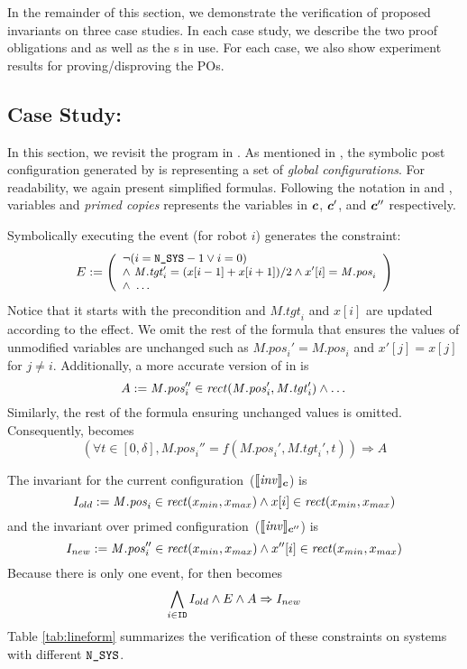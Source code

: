 In the remainder of this section,
we demonstrate the verification of proposed invariants on three case studies.
In each case study, we describe the two proof obligations  and 
as well as the \portasum{}s in use.
For each case, we also show experiment results for proving/disproving the POs.


\subsection{Case Study: \LineForm}

\newcommand{\Mposi}{\mathit{M.pos}_i}
\newcommand{\Mtgti}{\mathit{M.tgt}_i}

In this section, we revisit the \LineForm program in .
As mentioned in , the symbolic post configuration generated by \K is representing a set of \emph{global configurations}.
For readability, we again present simplified formulas.
Following the notation in  and ,
variables and \emph{primed copies} represents the variables in $\mathit{\boldsymbol{c}}$, $\mathit{\boldsymbol{c}}'$, and $\mathit{\boldsymbol{c}}''$ respectively.

Symbolically executing the event  (for robot $i$) generates the constraint:
\[
\small
E :=
\left(
\begin{array}{l}
    \neg (i = \NMAX - 1 \lor i = 0) \\
    \land\ \Mtgti' = (x[i-1] + x[i+1])/2 \land x'[i] = \Mposi \\
    \land\ \dots
\end{array}
\right)
\]
Notice that it starts with the precondition and $\Mtgti$ and $x[i]$ are updated according to the effect.
We omit the rest of the formula that ensures the values of unmodified variables are unchanged
such as $\Mposi'=\Mposi$ and $x'[j]=x[j]$ for $j\neq i$.
Additionally, a more accurate version of  in  is
\[
A := \Mposi'' \in \rect(\Mposi', \Mtgti') \land \dots
\]
Similarly, the rest of the formula ensuring unchanged values is omitted.
Consequently,  becomes
\[
(\forall t \in [0,\delta], \Mposi'' = f(\Mposi', \Mtgti', t)) \Rightarrow A
\]

The invariant for the current configuration~($\llbracket\mathit{inv}\rrbracket_{\mathit{\boldsymbol{c}}}$) is
\[
\small
I_{old}:= \Mposi \in \rect(x_{min}, x_{max}) \wedge x[i] \in \rect(x_{min}, x_{max})
\]
and the invariant over primed configuration~($\llbracket\mathit{inv}\rrbracket_{\mathit{\boldsymbol{c}}''}$) is
\[
\small
I_{new} := \Mposi'' \in \rect(x_{min}, x_{max}) \wedge x''[i] \in \rect(x_{min}, x_{max})
\]
Because there is only one event,  for \LineForm then becomes
\[
\bigwedge_{i\in \texttt{ID}} I_{old} \wedge E \wedge A \Rightarrow I_{new}
\]
Table \ref{tab:lineform} summarizes the verification of these constraints on systems with different $\texttt{N\_SYS}$.


